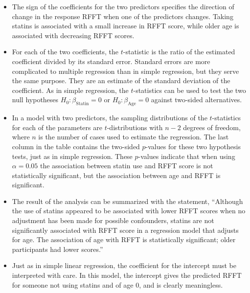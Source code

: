 \begin{itemize}
 \item  The sign of the coefficients for the two predictors specifies the direction of change in the response RFFT when one of the predictors changes. Taking statins is associated with a small increase in RFFT score, while older age is associated with decreasing RFFT scores.
 
 \item  For each of the two coefficients, the $t$-statistic is the ratio of the estimated coefficient divided by its standard error.  Standard errors are more complicated to multiple regression than in simple regression, but they serve the same purpose.  They are an estimate of the standard deviation of the coefficient.  As in simple regression, the $t$-statistics can be used to test the two null hypotheses $H_0:\beta_{\text{Statin}} = 0$ or $H_0:\beta_{\text{Age}} = 0$ against two-sided alternatives.
  
  \item In a model with two predictors, the sampling distributions of the $t$-statistics for each of the parameters are $t$-distributions with $n - 2$ degrees of freedom, where $n$ is the number of cases used to estimate the regression. The last column in the table contains the two-sided $p$-values for these two hypothesis tests, just as in simple regression.  These $p$-values indicate that when using $\alpha = 0.05$ the association between statin use and RFFT score is not statistically significant, but the association between age and RFFT is significant.
  
  \item  The result of the analysis can be summarized with the statement, ``Although the use of statins appeared to be associated with lower RFFT scores when no adjustment has been made for possible confounders, statins are not significantly associated with RFFT score in a regression model that adjusts for age.  The association of age with RFFT is statistically significant; older participants had lower scores.''
  
  \item Just as in simple linear regression, the coefficient for the intercept must be interpreted with care.  In this model, the intercept gives the predicted RFFT for someone not using statins and of age 0, and is clearly meaningless.
  

\end{itemize}
